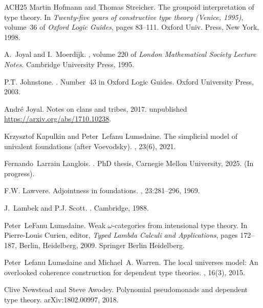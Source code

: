 \documentclass[12pt,reqno]{amsart}
\theoremstyle{remark}
\theoremstyle{definition}
\begin{document}
\begin{thebibliography}{ACH{\etalchar{+}}25}
Martin Hofmann and Thomas Streicher.
\newblock The groupoid interpretation of type theory.
\newblock In {\em Twenty-five years of constructive type theory ({V}enice,
  1995)}, volume~36 of {\em Oxford Logic Guides}, pages 83--111. Oxford Univ.
  Press, New York, 1998.

A.~Joyal and I.~Moerdijk.
, volume 220 of {\em London Mathematical
  Society Lecture Notes}.
\newblock Cambridge University Press, 1995.

P.T. Johnstone.
.
\newblock Number~43 in Oxford Logic Guides. Oxford University Press, 2003.

Andr\'e Joyal.
\newblock Notes on clans and tribes, 2017.
\newblock unpublished \url{https://arxiv.org/abs/1710.10238}.

Krzysztof Kapulkin and Peter~Lefanu Lumsdaine.
\newblock The simplicial model of univalent foundations (after {V}oevodsky).
, 23(6), 2021.

Fernando~Larrain Langlois.
.
\newblock Ph{D} thesis, Carnegie Mellon University, 2025.
\newblock (In progress).

F.W. Lawvere.
\newblock Adjointness in foundations.
, 23:281--296, 1969.

J.~Lambek and P.J. Scott.
.
\newblock Cambridge, 1988.

Peter~LeFanu Lumsdaine.
\newblock Weak $\omega$-categories from intensional type theory.
\newblock In Pierre-Louis Curien, editor, {\em Typed Lambda Calculi and
  Applications}, pages 172--187, Berlin, Heidelberg, 2009. Springer Berlin
  Heidelberg.

Peter~Lefanu Lumsdaine and Michael~A. Warren.
\newblock The local universes model: An overlooked coherence construction for
  dependent type theories.
, 16(3), 2015.

Clive Newstead and Steve Awodey.
\newblock Polynomial pseudomonads and dependent type theory.
\newblock arXiv:1802.00997, 2018.


\end{thebibliography}
\end{document}
